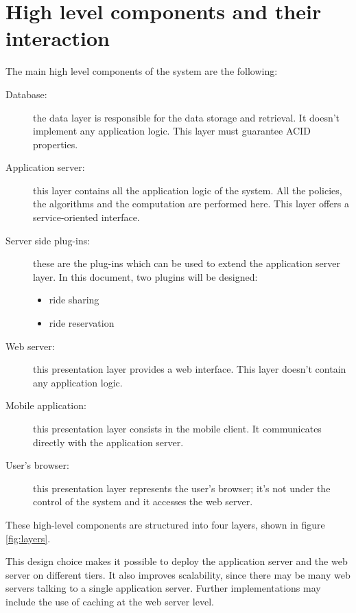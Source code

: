 \section{High level components and their interaction}
\label{sec:high-level}

The main high level components of the system are the following:
\begin{description}
	\item[Database:] the data layer is responsible for the data storage and retrieval. It doesn't implement any application logic. This layer must guarantee ACID properties.
	\item[Application server:] this layer contains all the application logic of the system. All the policies, the algorithms and the computation are performed here. This layer offers a service-oriented interface.
	\item[Server side plug-ins:] these are the plug-ins which can be used to extend the application server layer. In this document, two plugins will be designed:
		\begin{itemize}
		\item ride sharing
		\item ride reservation
		\end{itemize}
	\item[Web server:] this presentation layer provides a web interface. This layer doesn't contain any application logic.
	\item[Mobile application:] this presentation layer consists in the mobile client. It communicates directly with the application server.
	\item[User's browser:] this presentation layer represents the user's browser; it's not under the control of the system and it accesses the web server.
\end{description}

These high-level components are structured into four layers, shown in figure \ref{fig:layers}.

This design choice makes it possible to deploy the application server and the web server on different tiers. It also improves scalability, since there may be many web servers talking to a single application server. Further implementations may include the use of caching at the web server level.

